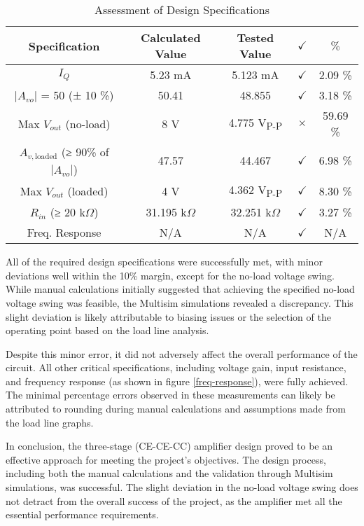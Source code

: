 

{{\begin{table}[H]
\centering
\align
\begin{tabular}{|c|c|c|c|c|}
\hline
\hline
\textbf{Specification} & \textbf{Calculated Value} & \textbf{Tested Value} & \(\checkmark\) & \(\%\) \\ \hline
\hline
\(I_Q\) & 5.23 mA & 5.123 mA & \(\checkmark\) & 2.09 \% \\ \hline
\(|A_{vo}|\) = 50 (± 10 \%) & 50.41 & 48.855 & \(\checkmark\) & 3.18 \% \\ \hline
Max \(V_{out}\) (no-load) & 8 V & 4.775 V\textsubscript{P-P} & \(\times\) & 59.69 \% \\ \hline
\(A_{v, \text{loaded}}\) (≥ 90\% of \(|A_{vo}|\)) & 47.57 & 44.467 & \(\checkmark\) & 6.98 \% \\ \hline
Max \(V_{out}\) (loaded) & 4 V & 4.362 V\textsubscript{P-P} & \(\checkmark\) & 8.30 \% \\ \hline
\(R_{in}\) (≥ 20 k\(\Omega\)) & 31.195 k\(\Omega\) & 32.251 k\(\Omega\) & \(\checkmark\) & 3.27 \% \\ \hline
Freq. Response & N/A & N/A & \(\checkmark\) & N/A \\ \hline
\hline
\end{tabular}
\caption{Assessment of Design Specifications}
\label{table:C1}
\end{table}}}

{All of the required design specifications were successfully met, with minor deviations well within the 10\% margin, except for the no-load voltage swing. While manual calculations initially suggested that achieving the specified no-load voltage swing was feasible, the Multisim simulations revealed a discrepancy. This slight deviation is likely attributable to biasing issues or the selection of the operating point based on the load line analysis.}

{Despite this minor error, it did not adversely affect the overall performance of the circuit. All other critical specifications, including voltage gain, input resistance, and frequency response (as shown in figure \ref{freq-response}), were fully achieved. The minimal percentage errors observed in these measurements can likely be attributed to rounding during manual calculations and assumptions made from the load line graphs.}

{In conclusion, the three-stage (CE-CE-CC) amplifier design proved to be an effective approach for meeting the project’s objectives. The design process, including both the manual calculations and the validation through Multisim simulations, was successful. The slight deviation in the no-load voltage swing does not detract from the overall success of the project, as the amplifier met all the essential performance requirements.}

{}

{}

{}

{}

{}

{}

{}

{}

{}

{}

{}

{}


